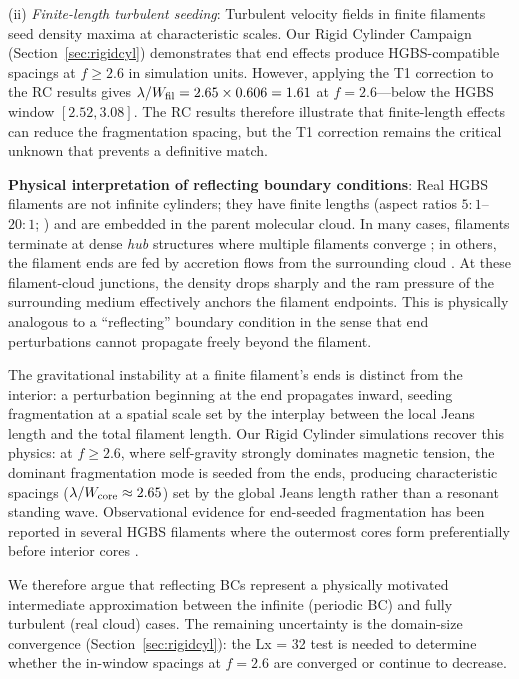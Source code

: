 \documentclass[twoside,twocolumn]{mnras}
\begin{document}
(ii) \textit{Finite-length turbulent seeding}: Turbulent velocity fields in finite
filaments seed density maxima at characteristic scales. Our Rigid Cylinder Campaign
(Section~\ref{sec:rigidcyl}) demonstrates that end effects produce HGBS-compatible spacings
at $f \geq 2.6$ in simulation units. However, applying the T1 correction to the
RC results gives $\lambda/W_{\rm fil} = 2.65 \times 0.606 = 1.61$ at $f = 2.6$---below
the HGBS window $[2.52, 3.08]$. The RC results therefore illustrate that finite-length
effects can reduce the fragmentation spacing, but the T1 correction remains the critical
unknown that prevents a definitive match.

\textbf{Physical interpretation of reflecting boundary conditions}: Real HGBS filaments
are not infinite cylinders; they have finite lengths (aspect ratios $5:1$--$20:1$;
\citealt{Arzoumanian2019}) and are embedded in the parent molecular cloud. In many cases,
filaments terminate at dense \textit{hub} structures where multiple filaments converge
\citep{Andre2010}; in others, the filament ends are fed by accretion flows from the
surrounding cloud \citep{Inutsuka1997, Pineda2023}. At these filament-cloud junctions,
the density drops sharply and the ram pressure of the surrounding medium effectively
anchors the filament endpoints. This is physically analogous to a ``reflecting'' boundary
condition in the sense that end perturbations cannot propagate freely beyond the
filament.

The gravitational instability at a finite filament's ends is distinct from the interior:
a perturbation beginning at the end propagates inward, seeding fragmentation at a spatial
scale set by the interplay between the local Jeans length and the total filament length.
Our Rigid Cylinder simulations recover this physics: at $f \geq 2.6$, where self-gravity
strongly dominates magnetic tension, the dominant fragmentation mode is seeded from the
ends, producing characteristic spacings ($\lambda/W_{\rm core} \approx 2.65$) set by
the global Jeans length rather than a resonant standing wave. Observational evidence
for end-seeded fragmentation has been reported in several HGBS filaments where the
outermost cores form preferentially before interior cores \citep{Pineda2023, Andre2010}.

We therefore argue that reflecting BCs represent a physically motivated intermediate
approximation between the infinite (periodic BC) and fully turbulent (real cloud) cases.
The remaining uncertainty is the domain-size convergence (Section~\ref{sec:rigidcyl}):
the Lx = 32 test is needed to determine whether the in-window spacings at $f = 2.6$
are converged or continue to decrease.
\end{document}
